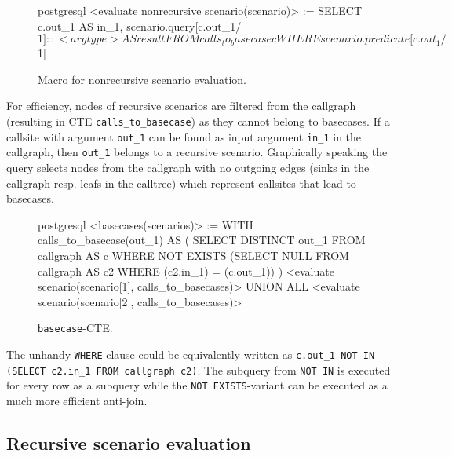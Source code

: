 \begin{figure}[h!]
    \centering
    \vspace{1cm}
    \begin{cminted}{postgresql}
<evaluate nonrecursive scenario(scenario)>
 := SELECT c.out_1                               AS in_1, 
           scenario.query[c.out_1/$1]::<argtype> AS result
    FROM calls_to_basecase c
    WHERE scenario.predicate[c.out_1/$1]
    \end{cminted}
    \caption{Macro for nonrecursive scenario evaluation.}
    \label{macro:single_basecase}
\end{figure}

For efficiency, nodes of recursive scenarios are filtered from the callgraph (resulting in CTE \texttt{calls\_to\_basecase}) as they cannot belong to basecases. If a callsite with argument \texttt{out\_1} can be found as input argument \texttt{in\_1} in the callgraph, then \texttt{out\_1} belongs to a recursive scenario. Graphically speaking the query selects nodes from the callgraph with no outgoing edges (sinks in the callgraph resp. leafs in the calltree) which represent callsites that lead to basecases.

\begin{figure}[h!]
    \centering
    \begin{cminted}{postgresql}
<basecases(scenarios)> := 
   WITH calls_to_basecase(out_1) AS (
       SELECT DISTINCT out_1 
       FROM callgraph AS c
       WHERE NOT EXISTS (SELECT NULL FROM callgraph AS c2 WHERE (c2.in_1) = (c.out_1))
   )
   <evaluate scenario(scenario[1], calls_to_basecases)>
     UNION ALL 
   <evaluate scenario(scenario[2], calls_to_basecases)>
    \end{cminted}
    \caption{\texttt{basecase}-CTE.}
    \label{macro:basecases}
\end{figure}

The unhandy \texttt{WHERE}-clause could be equivalently written as \texttt{c.out_1 NOT IN (SELECT c2.in_1 FROM callgraph c2)}. %
The subquery from \texttt{NOT IN} is executed for every row as a subquery while the \texttt{NOT EXISTS}-variant can be executed as a much more efficient anti-join.

\subsection{Recursive scenario evaluation}

